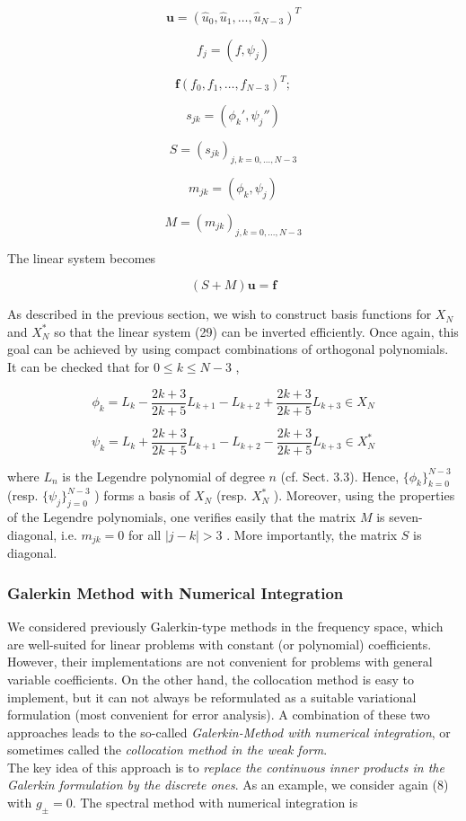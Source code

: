 \[
	\mathbf{ u } = \left( \widehat{ u }_{ 0 }, \widehat{ u }_{ 1 }, \ldots, \widehat{ u }_{ N-3 } \right)^{ T }
\]

\[
	f_{ j } = \left( f, \psi_{ j } \right)
\]

\[
	\mathbf{ f } \left( f_{ 0 }, f_{ 1 }, \ldots, f_{ N-3 } \right)^{ T };
\]

\[
	s_{ jk } = \left( \phi_{ k }', \psi_{ j }'' \right)
\]

\[
	S = \left( s_{ jk } \right)_{ j,k=0,\ldots , N-3 }
\]

\[
	m_{ jk } = \left( \phi_{ k }, \psi_{ j } \right)
\]

\[
	M = \left( m_{ jk } \right)_{ j,k=0,\ldots,N-3 }
\]

The linear system becomes

\begin{equation}
	(S+M) \mathbf{ u } = \mathbf{ f }
\end{equation}

As described in the previous section, we wish to construct basis functions for $ X_{ N } $ and $ X_{ N }^{ * } $ so that the linear system (29) can be inverted efficiently. Once again, this goal can be achieved by using compact combinations of orthogonal polynomials. It can be checked that for $ 0 \leq k \leq N-3 $ ,  

\[
	\phi_{ k } =L_{ k } - \frac{2k+3}{2k+5} L_{ k+1 } - L_{ k+2 } + \frac{2k+3}{2k+5} L_{ k+3 } \in X_{ N }
\]

\[
\psi_{ k } = L_{ k } + \frac{2k+3}{2k+5} L_{ k+1 } - L_{ k+2 } - \frac{2k+3}{2k+5} L_{ k+3 } \in X_{ N }^{ * }
\]

where $ L_{ n } $ is the Legendre polynomial of degree $ n $ (cf. Sect. 3.3). Hence, $ \{ \phi_{ k }\}_{ k=0 }^{ N-3 }  $ (resp. $ \{ \psi_{ j } \}_{ j=0 }^{ N-3 } $ ) forms a basis of $ X_{ N } $ (resp. $ X_{ N }^{ * } $ ). Moreover, using the properties of the Legendre polynomials, one verifies easily that the matrix $ M $ is seven-diagonal, i.e. $ m_{ jk } = 0 $ for all $ \vert j-k \vert > 3 $ . More importantly, the matrix $ S $ is diagonal. 

\subsubsection{Galerkin Method with Numerical Integration}

We considered previously Galerkin-type methods in the frequency space, which are well-suited for linear problems with constant (or polynomial) coefficients. However, their implementations are not convenient for problems with general variable coefficients. On the other hand, the collocation method is easy to implement, but it can not always be reformulated as a suitable variational formulation (most convenient for error analysis). A combination of these two approaches leads to the so-called \textit{Galerkin-Method with numerical integration}, or sometimes called the \textit{collocation method in the weak form}. \\
\indent The key idea of this approach is to \textit{replace the continuous inner products in the Galerkin formulation by the discrete ones}. As an example, we consider again (8) with $ g_{ \pm } = 0 $. The spectral method with numerical integration is 

